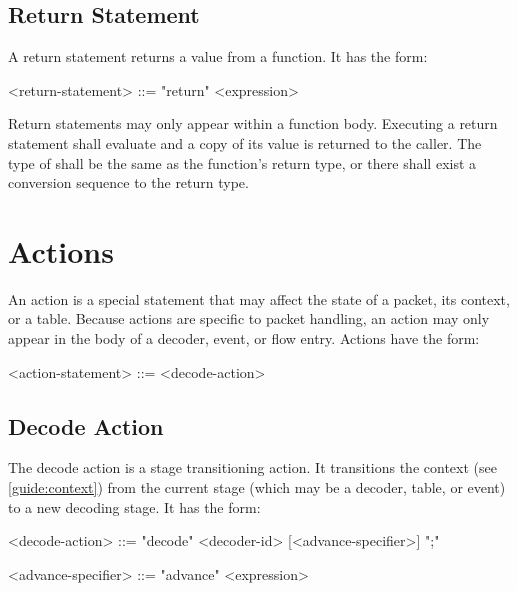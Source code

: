 \subsection{Return Statement} \label{guide:return_stmt}

A return statement returns a value from a function. It has the form:

\begin{minip}
\begin{grammar}
<return-statement> ::= "return" <expression>
\end{grammar}
\end{minip}

Return statements may only appear within a function body. Executing a return statement shall evaluate  and a copy of its value is returned to the caller. The type of  shall be the same as the function's return type, or there shall exist a conversion sequence to the return type.

\section{Actions} \label{guide:action}

An action is a special statement that may affect the state of a packet, its context, or a table. Because actions are specific to packet handling, an action may only appear in the body of a decoder, event, or flow entry. Actions have the form:

\begin{minip}
\begin{grammar}
<action-statement> ::=
<decode-action>
\end{grammar}
\end{minip}


\subsection{Decode Action} \label{guide:decode_action}

The decode action is a stage transitioning action. It transitions the context (see \ref{guide:context}) from the current stage (which may be a decoder, table, or event) to a new decoding stage. It has the form:

\begin{minip}
\begin{grammar}
<decode-action> ::=
"decode" <decoder-id> [<advance-specifier>] ";"

<advance-specifier> ::= "advance" <expression>
\end{grammar}
\end{minip}


